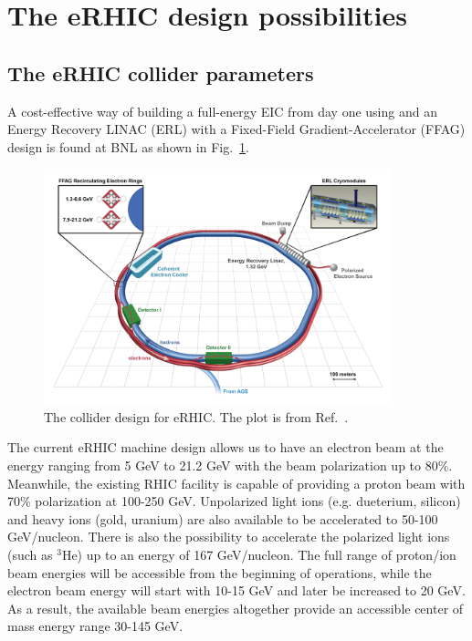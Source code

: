 \section{The eRHIC design possibilities}

\subsection{The eRHIC collider parameters}
A cost-effective way of building a full-energy EIC from day one using and an
Energy Recovery LINAC (ERL) with a Fixed-Field Gradient-Accelerator (FFAG)
design is found at BNL as shown in Fig.~\ref{fig:collider_eRHIC}.
\begin{figure}
\centering
\includegraphics[width=0.9\textwidth]{plots/chpt4/collider_eRHIC.png}
\caption[A layout of the eRHIC collider design]{
The collider design for eRHIC. The plot is from Ref.~\cite{Aschenauer:2014a}.}
\label{fig:collider_eRHIC}
\end{figure}
The current eRHIC machine design allows us to have an electron beam at the
energy ranging from 5 GeV to 21.2 GeV with the beam polarization up to 80\%.
Meanwhile, the existing RHIC facility is capable of providing a proton beam with
70\% polarization at 100-250 GeV. Unpolarized light ions (e.g. dueterium,
silicon) and heavy ions (gold, uranium) are also available to be accelerated to
50-100 GeV/nucleon. There is also the possibility to accelerate the polarized
light ions (such as $^{3}$He) up to an energy of 167 GeV/nucleon. The full range of
proton/ion beam energies will be accessible from the beginning of operations,
while the electron beam energy will start with 10-15 GeV and later be increased
to 20 GeV. As a result, the available beam energies altogether provide an
accessible center of mass energy range 30-145 GeV.



